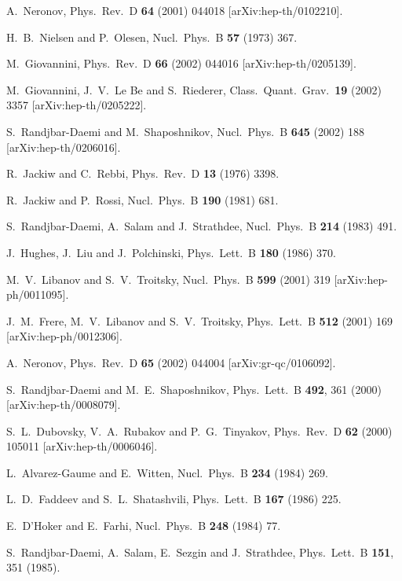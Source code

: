 \documentclass[a4paper,12pt]{article}
\begin{document}
\begin{thebibliography}{99}
A.~Neronov,
Phys.\ Rev.\ D {\bf 64} (2001) 044018
[arXiv:hep-th/0102210].

H.~B.~Nielsen and P.~Olesen,
Nucl.\ Phys.\ B {\bf 57} (1973) 367.

M.~Giovannini,
Phys.\ Rev.\ D {\bf 66} (2002) 044016
[arXiv:hep-th/0205139].

M.~Giovannini, J.~V.~Le Be and S.~Riederer,
Class.\ Quant.\ Grav.\  {\bf 19} (2002) 3357
[arXiv:hep-th/0205222].

S.~Randjbar-Daemi and M.~Shaposhnikov,
Nucl.\ Phys.\ B {\bf 645} (2002) 188
[arXiv:hep-th/0206016].

R.~Jackiw and C.~Rebbi,
Phys.\ Rev.\ D {\bf 13} (1976) 3398.

R.~Jackiw and P.~Rossi,
Nucl.\ Phys.\ B {\bf 190} (1981) 681.

S.~Randjbar-Daemi, A.~Salam and J.~Strathdee,
Nucl.\ Phys.\ B {\bf 214} (1983) 491.

J.~Hughes, J.~Liu and J.~Polchinski,
Phys.\ Lett.\ B {\bf 180} (1986) 370.

M.~V.~Libanov and S.~V.~Troitsky,
Nucl.\ Phys.\ B {\bf 599} (2001) 319
[arXiv:hep-ph/0011095].

J.~M.~Frere, M.~V.~Libanov and S.~V.~Troitsky,
Phys.\ Lett.\ B {\bf 512} (2001) 169
[arXiv:hep-ph/0012306].

A.~Neronov,
Phys.\ Rev.\ D {\bf 65} (2002) 044004
[arXiv:gr-qc/0106092].

S.~Randjbar-Daemi and M.~E.~Shaposhnikov,
Phys.\ Lett.\ B {\bf 492}, 361 (2000)
[arXiv:hep-th/0008079].

S.~L.~Dubovsky, V.~A.~Rubakov and P.~G.~Tinyakov,
Phys.\ Rev.\ D {\bf 62} (2000) 105011
[arXiv:hep-th/0006046].

L.~Alvarez-Gaume and E.~Witten,
Nucl.\ Phys.\ B {\bf 234} (1984) 269.

L.~D.~Faddeev and S.~L.~Shatashvili,
Phys.\ Lett.\ B {\bf 167} (1986) 225.

E.~D'Hoker and E.~Farhi,
Nucl.\ Phys.\ B {\bf 248} (1984) 77.

S.~Randjbar-Daemi, A.~Salam, E.~Sezgin and J.~Strathdee,
Phys.\ Lett.\ B {\bf 151}, 351 (1985).

\end{thebibliography}
\end{document}
